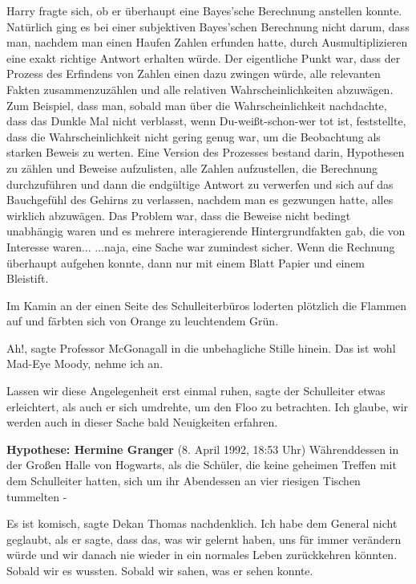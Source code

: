 Harry fragte sich, ob er überhaupt eine Bayes'sche Berechnung anstellen konnte.
Natürlich ging es bei einer subjektiven Bayes'schen Berechnung nicht darum, dass
man, nachdem man einen Haufen Zahlen erfunden hatte, durch Ausmultiplizieren
eine exakt richtige Antwort erhalten würde. Der eigentliche Punkt war, dass der
Prozess des Erfindens von Zahlen einen dazu zwingen würde, alle relevanten
Fakten zusammenzuzählen und alle relativen Wahrscheinlichkeiten abzuwägen. Zum
Beispiel, dass man, sobald man über die Wahrscheinlichkeit nachdachte, dass das
Dunkle Mal nicht verblasst, wenn Du-weißt-schon-wer tot ist, feststellte, dass
die Wahrscheinlichkeit nicht gering genug war, um die Beobachtung als starken
Beweis zu werten. Eine Version des Prozesses bestand darin, Hypothesen zu zählen
und Beweise aufzulisten, alle Zahlen aufzustellen, die Berechnung durchzuführen
und dann die endgültige Antwort zu verwerfen und sich auf das Bauchgefühl des
Gehirns zu verlassen, nachdem man es gezwungen hatte, alles wirklich abzuwägen.
Das Problem war, dass die Beweise nicht bedingt unabhängig waren und es mehrere
interagierende Hintergrundfakten gab, die von Interesse waren... ...naja, eine
Sache war zumindest sicher. Wenn die Rechnung überhaupt aufgehen konnte, dann
nur mit einem Blatt Papier und einem Bleistift.

Im Kamin an der einen Seite des Schulleiterbüros loderten plötzlich die Flammen
auf und färbten sich von Orange zu leuchtendem Grün.

\glqq Ah!\grqq{}, sagte Professor McGonagall in die unbehagliche Stille hinein.
\glqq Das ist wohl Mad-Eye Moody, nehme ich an.\grqq{}

\glqq Lassen wir diese Angelegenheit erst einmal ruhen\grqq{}, sagte der
Schulleiter etwas erleichtert, als auch er sich umdrehte, um den Floo zu
betrachten. \glqq Ich glaube, wir werden auch in dieser Sache bald Neuigkeiten
erfahren.\grqq{}

\textbf{Hypothese: Hermine Granger }(8. April 1992, 18:53 Uhr) Währenddessen in
der Großen Halle von Hogwarts, als die Schüler, die keine geheimen Treffen mit
dem Schulleiter hatten, sich um ihr Abendessen an vier riesigen Tischen
tummelten -

\glqq Es ist komisch\grqq{}, sagte Dekan Thomas nachdenklich. \glqq Ich habe dem
General nicht geglaubt, als er sagte, dass das, was wir gelernt haben, uns für
immer verändern würde und wir danach nie wieder in ein normales Leben
zurückkehren könnten. Sobald wir es wussten. Sobald wir sahen, was er sehen
konnte.\grqq{}


